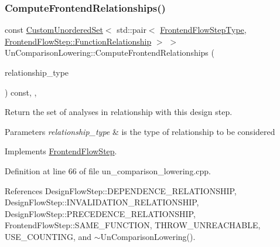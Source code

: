 \subsubsection{\texorpdfstring{Compute\+Frontend\+Relationships()}{ComputeFrontendRelationships()}}
{\footnotesize\ttfamily const \hyperlink{classCustomUnorderedSet}{Custom\+Unordered\+Set}$<$ std\+::pair$<$ \hyperlink{frontend__flow__step_8hpp_afeb3716c693d2b2e4ed3e6d04c3b63bb}{Frontend\+Flow\+Step\+Type}, \hyperlink{classFrontendFlowStep_af7cf30f2023e5b99e637dc2058289ab0}{Frontend\+Flow\+Step\+::\+Function\+Relationship} $>$ $>$ Un\+Comparison\+Lowering\+::\+Compute\+Frontend\+Relationships (\begin{DoxyParamCaption}\item[{const \hyperlink{classDesignFlowStep_a723a3baf19ff2ceb77bc13e099d0b1b7}{Design\+Flow\+Step\+::\+Relationship\+Type}}]{relationship\+\_\+type }\end{DoxyParamCaption}) const\hspace{0.3cm}{\ttfamily [override]}, {\ttfamily [protected]}, {\ttfamily [virtual]}}



Return the set of analyses in relationship with this design step. 


\begin{DoxyParams}{Parameters}
{\em relationship\+\_\+type} & is the type of relationship to be considered \\
\hline
\end{DoxyParams}


Implements \hyperlink{classFrontendFlowStep_abeaff70b59734e462d347ed343dd700d}{Frontend\+Flow\+Step}.



Definition at line 66 of file un\+\_\+comparison\+\_\+lowering.\+cpp.



References Design\+Flow\+Step\+::\+D\+E\+P\+E\+N\+D\+E\+N\+C\+E\+\_\+\+R\+E\+L\+A\+T\+I\+O\+N\+S\+H\+IP, Design\+Flow\+Step\+::\+I\+N\+V\+A\+L\+I\+D\+A\+T\+I\+O\+N\+\_\+\+R\+E\+L\+A\+T\+I\+O\+N\+S\+H\+IP, Design\+Flow\+Step\+::\+P\+R\+E\+C\+E\+D\+E\+N\+C\+E\+\_\+\+R\+E\+L\+A\+T\+I\+O\+N\+S\+H\+IP, Frontend\+Flow\+Step\+::\+S\+A\+M\+E\+\_\+\+F\+U\+N\+C\+T\+I\+ON, T\+H\+R\+O\+W\+\_\+\+U\+N\+R\+E\+A\+C\+H\+A\+B\+LE, U\+S\+E\+\_\+\+C\+O\+U\+N\+T\+I\+NG, and $\sim$\+Un\+Comparison\+Lowering().

